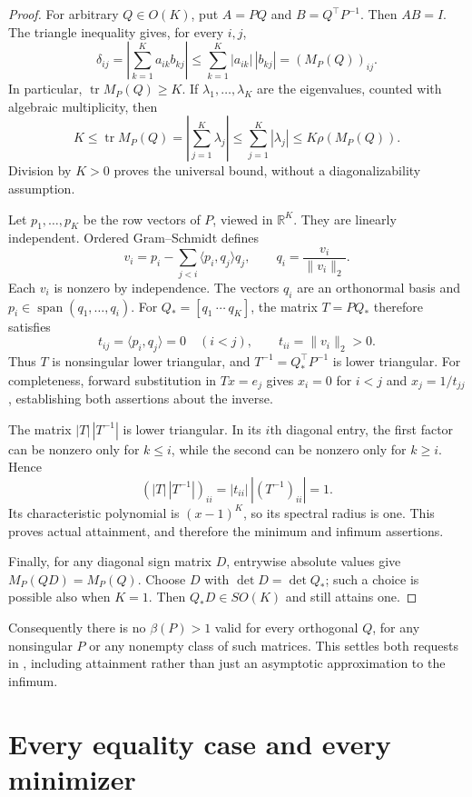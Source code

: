 \documentclass[11pt]{article}
\newcommand{\RR}{\mathbb R}
\newcommand{\tr}{\operatorname{tr}}
\begin{document}
\begin{proof}
For arbitrary $Q\in O(K)$, put $A=PQ$ and $B=Q^\top P^{-1}$.
Then $AB=I$. The triangle inequality gives, for every $i,j$,
\[
 \delta_{ij}=\left|\sum_{k=1}^K a_{ik}b_{kj}\right|
 \leq\sum_{k=1}^K|a_{ik}|\,|b_{kj}|=(M_P(Q))_{ij}.
\]
In particular, $\tr M_P(Q)\geq K$. If $\lambda_1,\ldots,\lambda_K$
are the eigenvalues, counted with algebraic multiplicity, then
\[
 K\leq\tr M_P(Q)
 =\left|\sum_{j=1}^K\lambda_j\right|
 \leq\sum_{j=1}^K|\lambda_j|
 \leq K\rho(M_P(Q)).
\]
Division by $K>0$ proves the universal bound, without a
diagonalizability assumption.

Let $p_1,\ldots,p_K$ be the row vectors of $P$, viewed in $\RR^K$.
They are linearly independent. Ordered Gram--Schmidt defines
\[
 v_i=p_i-\sum_{j<i}\langle p_i,q_j\rangle q_j,
 \qquad q_i=\frac{v_i}{\|v_i\|_2}.
\]
Each $v_i$ is nonzero by independence. The vectors $q_i$ are an
orthonormal basis and
$p_i\in\operatorname{span}(q_1,\ldots,q_i)$.
For $Q_*=[q_1\ \cdots\ q_K]$, the matrix $T=PQ_*$ therefore satisfies
\[
 t_{ij}=\langle p_i,q_j\rangle=0\quad(i<j),
 \qquad t_{ii}=\|v_i\|_2>0.
\]
Thus $T$ is nonsingular lower triangular, and
$T^{-1}=Q_*^\top P^{-1}$ is lower triangular. For completeness,
forward substitution in $Tx=e_j$ gives $x_i=0$ for $i<j$ and
$x_j=1/t_{jj}$, establishing both assertions about the inverse.

The matrix $|T|\,|T^{-1}|$ is lower triangular. In its $i$th diagonal
entry, the first factor can be nonzero only for $k\leq i$, while the
second can be nonzero only for $k\geq i$. Hence
\[
 (|T|\,|T^{-1}|)_{ii}
 =|t_{ii}|\,|(T^{-1})_{ii}|=1.
\]
Its characteristic polynomial is $(x-1)^K$, so its spectral radius is
one. This proves actual attainment, and therefore the minimum and
infimum assertions.

Finally, for any diagonal sign matrix $D$, entrywise absolute values give
$M_P(QD)=M_P(Q)$. Choose $D$ with $\det D=\det Q_*$; such a choice is
possible also when $K=1$. Then $Q_*D\in SO(K)$ and still attains one.
\end{proof}

Consequently there is no $\beta(P)>1$ valid for every orthogonal $Q$, for any
nonsingular $P$ or any nonempty class of such matrices. This settles both
requests in \cite{question}, including attainment rather than just an
asymptotic approximation to the infimum.

\section{Every equality case and every minimizer}
\end{document}
